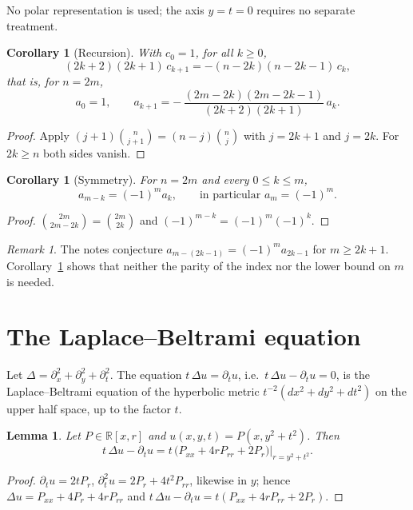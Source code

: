 \documentclass[11pt,a4paper]{article}
\newcommand{\R}{\mathbb{R}}
\newtheorem{corollary}[theorem]{Corollary}
\newtheorem{lemma}[theorem]{Lemma}
\theoremstyle{remark}
\newtheorem{remark}[theorem]{Remark}
\begin{document}
No polar representation is used; the axis $y=t=0$ requires no separate treatment.

\begin{corollary}[Recursion]\label{cor:rec}
With $c_0=1$, for all $k\ge 0$,
\[
  (2k+2)(2k+1)\,c_{k+1}=-(n-2k)(n-2k-1)\,c_k ,
\]
that is, for $n=2m$,
\[
  \boxed{\;a_0=1,\qquad
  a_{k+1}=-\,\frac{(2m-2k)(2m-2k-1)}{(2k+2)(2k+1)}\,a_k .\;}
\]
\end{corollary}

\begin{proof}
Apply $(j+1)\binom{n}{j+1}=(n-j)\binom{n}{j}$ with $j=2k+1$ and $j=2k$. For
$2k\ge n$ both sides vanish.
\end{proof}

\begin{corollary}[Symmetry]\label{cor:sym}
For $n=2m$ and every $0\le k\le m$,
\[
  a_{m-k}=(-1)^m a_k ,\qquad\text{in particular } a_m=(-1)^m .
\]
\end{corollary}

\begin{proof}
$\binom{2m}{2m-2k}=\binom{2m}{2k}$ and $(-1)^{m-k}=(-1)^m(-1)^k$.
\end{proof}

\begin{remark}
The notes conjecture $a_{m-(2k-1)}=(-1)^m a_{2k-1}$ for $m\ge 2k+1$.
Corollary~\ref{cor:sym} shows that neither the parity of the index nor the lower
bound on $m$ is needed.
\end{remark}

\section{The Laplace--Beltrami equation}

Let $\Delta=\partial_x^2+\partial_y^2+\partial_t^2$. The equation
$t\,\Delta u=\partial_t u$, i.e.\ $t\,\Delta u-\partial_t u=0$, is the
Laplace--Beltrami equation of the hyperbolic metric $t^{-2}(dx^2+dy^2+dt^2)$ on
the upper half space, up to the factor $t$.

\begin{lemma}\label{lem:axial}
Let $P\in\R[x,r]$ and $u(x,y,t)=P(x,y^2+t^2)$. Then
\[
  t\,\Delta u-\partial_t u=t\,\bigl(P_{xx}+4rP_{rr}+2P_r\bigr)\big|_{r=y^2+t^2}.
\]
\end{lemma}

\begin{proof}
$\partial_t u=2tP_r$, $\partial_t^2u=2P_r+4t^2P_{rr}$, likewise in $y$; hence
$\Delta u=P_{xx}+4P_r+4rP_{rr}$ and $t\,\Delta u-\partial_tu=t(P_{xx}+4rP_{rr}+2P_r)$.
\end{proof}
\end{document}
